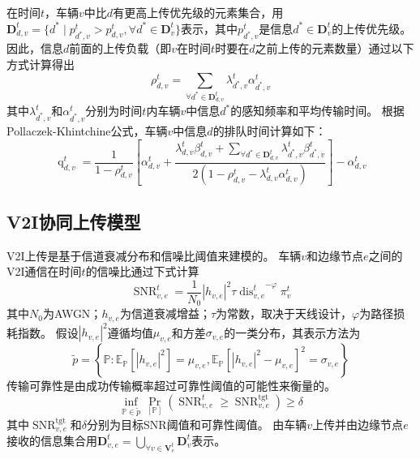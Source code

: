 在时间$t$，车辆$v$中比$d$有更高上传优先级的元素集合，用$\mathbf{D}_{d, v}^t = \{ d^* \mid p_{d^*, v}^{t} > p_{d, v}^{t} , \forall d^* \in \mathbf{D}_v^t \}$表示，其中$p_{d^*, v}^{t}$是信息$d^* \in \mathbf{D}_v^t$的上传优先级。
因此，信息$d$前面的上传负载（即$v$在时间$t$时要在$d$之前上传的元素数量）通过以下方式计算得出 
\begin{equation}
	\rho_{d, v}^{t}=\sum_{\forall d^* \in \mathbf{D}_{d, v}^t} \lambda_{d^*, v}^t \alpha_{d^*, v}^t
\end{equation}
其中$\lambda_{d^*, v}^t$和$\alpha_{d^*, v}^t$分别为时间$t$内车辆$v$中信息$d^*$的感知频率和平均传输时间。
根据Pollaczek-Khintchine公式\cite{takine2001queue}，车辆$v$中信息$d$的排队时间计算如下：
\begin{equation}
    \operatorname{q}_{d, v}^t= \frac{1} {1 - \rho_{d, v}^{t}} 
        \left[ \alpha_{d, v}^t + \frac{ \lambda_{d, v}^{t} \beta_{d, v}^t + \sum\limits_{\forall d^* \in \mathbf{D}_{d, v}^t} \lambda_{d^*, v}^t \beta_{d^*, v}^t }{2\left(1-\rho_{d, v}^{t} - \lambda_{d, v}^{t} \alpha_{d, v}^t\right)}\right] 
        - \alpha_{d, v}^t
\end{equation}

\subsection{V2I协同上传模型}
V2I上传是基于信道衰减分布和信噪比阈值来建模的。
车辆$v$和边缘节点$e$之间的V2I通信在时间$t$的信噪比通过下式计算\cite{sadek2009distributed}
\begin{equation}
    \operatorname{SNR}_{v, e}^{t}=\frac{1}{N_{0}} \left|h_{v, e}\right|^{2} \tau {\operatorname{dis}_{v, e}^{t}}^{-\varphi} {\pi}_v^t
\end{equation}
其中$N_{0}$为AWGN；$h_{v, e}$为信道衰减增益；$\tau$为常数，取决于天线设计，$\varphi$为路径损耗指数。
假设$\left|h_{v, e}\right|^{2}$遵循均值$\mu_{v, e}$和方差$\sigma_{v, e}$的一类分布，其表示方法为
\begin{equation}
    \tilde{p}=\left\{\mathbb{P}: \mathbb{E}_{\mathbb{P}}\left[\left|h_{v, e}\right|^{2}\right]=\mu_{v, e}, \mathbb{E}_{\mathbb{P}}\left[\left|h_{v, e}\right|^{2}-\mu_{v, e}\right]^{2}=\sigma_{v, e}\right\}
\end{equation}
传输可靠性是由成功传输概率超过可靠性阈值的可能性来衡量的。
\begin{equation}
    \inf_{\mathbb{P} \in \tilde{p}} \operatorname{Pr}_{[\mathbb{P}]}\left(\operatorname{SNR}_{v, e}^{t} \geq \operatorname{SNR}_{v, e}^{\operatorname{tgt}}\right) \geq \delta
\end{equation}
\noindent 其中$\operatorname{SNR}_{v, e}^{\operatorname{tgt}}$和$\delta$分别为目标SNR阈值和可靠性阈值。
由车辆$v$上传并由边缘节点$e$接收的信息集合用$\mathbf{D}_{v, e}^{t} = \bigcup_{\forall v \in \mathbf{V}_{e}^{t}} \mathbf{D}_{v}^{t}$表示。

